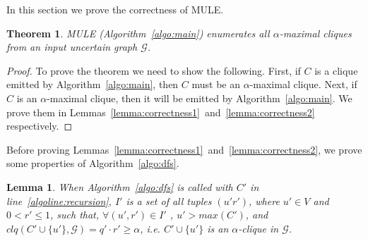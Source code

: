 \documentclass[11pt,letterpaper]{article}
\newtheorem{theorem}{Theorem}
\newtheorem{lemma}{Lemma}
\newcommand{\ugraph}{\mathcal{G}}
\newcommand{\cliqueprob}{clq}
\begin{document}
In this section we prove the correctness of MULE.

\begin{theorem}
\label{thm:correctness}
MULE (Algorithm~\ref{algo:main}) enumerates all $\alpha$-maximal cliques from an input uncertain graph $\ugraph$.
\end{theorem}

\begin{proof}
To prove the theorem we need to show the following. First, if $C$ is a clique emitted by Algorithm~\ref{algo:main}, then $C$ must be an $\alpha$-maximal clique. Next, if $C$ is an $\alpha$-maximal clique, then it will be emitted by Algorithm~\ref{algo:main}. We prove them in Lemmas~\ref{lemma:correctness1}~and~\ref{lemma:correctness2} respectively. 
\end{proof}

Before proving Lemmas~\ref{lemma:correctness1}~and~\ref{lemma:correctness2}, we prove some properties of Algorithm~\ref{algo:dfs}.

\begin{lemma}
\label{obs:I}
When Algorithm~\ref{algo:dfs} is called with $C'$ in line~\ref{algoline:recursion}, $I'$ is a set of all tuples $(u'r')$, where $u' \in V$ and $0 < r' \le 1$, such that, $\forall (u',r') \in I'$ , $u' > max(C')$,  and $\cliqueprob(C' \cup \{ u' \},\ugraph) = q' \cdot r' \ge \alpha$, i.e. $C' \cup \{ u' \}$ is an $\alpha$-clique in $\ugraph$.
\end{lemma}
\end{document}
